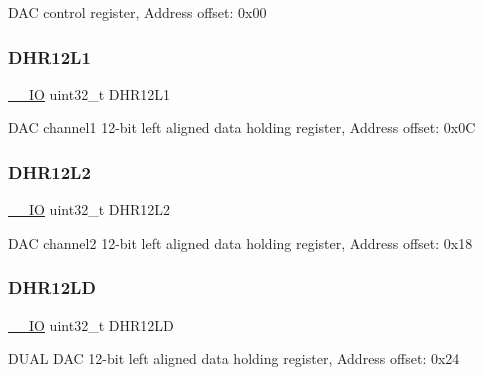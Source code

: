 D\+AC control register, Address offset\+: 0x00 \mbox{\label{struct_d_a_c___type_def_ae9028b8bcb5118b7073165fb50fcd559}} 
\subsubsection{\texorpdfstring{D\+H\+R12\+L1}{DHR12L1}}
{\footnotesize\ttfamily \mbox{\hyperlink{core__sc300_8h_aec43007d9998a0a0e01faede4133d6be}{\+\_\+\+\_\+\+IO}} uint32\+\_\+t D\+H\+R12\+L1}

D\+AC channel1 12-\/bit left aligned data holding register, Address offset\+: 0x0C \mbox{\label{struct_d_a_c___type_def_a2e45f9c9d67e384187b25334ba0a3e3d}} 
\subsubsection{\texorpdfstring{D\+H\+R12\+L2}{DHR12L2}}
{\footnotesize\ttfamily \mbox{\hyperlink{core__sc300_8h_aec43007d9998a0a0e01faede4133d6be}{\+\_\+\+\_\+\+IO}} uint32\+\_\+t D\+H\+R12\+L2}

D\+AC channel2 12-\/bit left aligned data holding register, Address offset\+: 0x18 \mbox{\label{struct_d_a_c___type_def_acc269320aff0a6482730224a4b641a59}} 
\subsubsection{\texorpdfstring{D\+H\+R12\+LD}{DHR12LD}}
{\footnotesize\ttfamily \mbox{\hyperlink{core__sc300_8h_aec43007d9998a0a0e01faede4133d6be}{\+\_\+\+\_\+\+IO}} uint32\+\_\+t D\+H\+R12\+LD}

D\+U\+AL D\+AC 12-\/bit left aligned data holding register, Address offset\+: 0x24 \mbox{\label{struct_d_a_c___type_def_ac2bb55b037b800a25852736afdd7a258}} 
